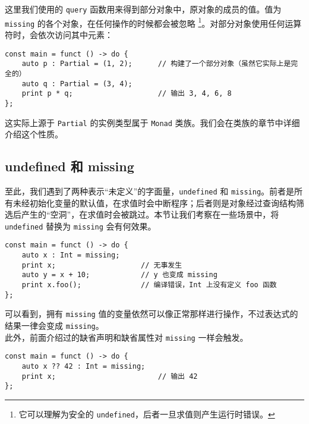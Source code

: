 这里我们使用的 \lstinline!query! 函数用来得到部分对象中，原对象的成员的值。值为 \lstinline!missing! 的各个对象，在任何操作的时候都会被忽略 \footnote{它可以理解为安全的 \lstinline!undefined!，后者一旦求值则产生运行时错误。}。对部分对象使用任何运算符时，会依次访问其中元素：

\begin{lstlisting}
const main = funct () -> do {
	auto p : Partial = (1, 2);		// 构建了一个部分对象（虽然它实际上是完全的）
	auto q : Partial = (3, 4);
	print p * q;					// 输出 3, 4, 6, 8
};
\end{lstlisting}

这实际上源于 \lstinline!Partial! 的实例类型属于 \lstinline!Monad! 类族。我们会在类族的章节中详细介绍这个性质。


\subsection{undefined 和 missing}

至此，我们遇到了两种表示“未定义”的字面量，\lstinline!undefined! 和 \lstinline!missing!。前者是所有未经初始化变量的默认值，在求值时会中断程序；后者则是对象经过查询结构筛选后产生的“空洞”，在求值时会被跳过。本节让我们考察在一些场景中，将 \lstinline!undefined! 替换为 \lstinline!missing! 会有何效果。

\begin{minipage}[c]{0.95\textwidth}
\vspace{1.0em}
\begin{lstlisting}
const main = funct () -> do {
    auto x : Int = missing;
    print x;					// 无事发生
    auto y = x + 10;			// y 也变成 missing
    print x.foo();				// 编译错误，Int 上没有定义 foo 函数
};
\end{lstlisting}
\end{minipage}

可以看到，拥有 \lstinline!missing! 值的变量依然可以像正常那样进行操作，不过表达式的结果一律会变成 \lstinline!missing!。 \\

此外，前面介绍过的缺省声明和缺省属性对 \lstinline!missing! 一样会触发。

\begin{minipage}[c]{0.95\textwidth}
\vspace{1.0em}
\begin{lstlisting}
const main = funct () -> do {
    auto x ?? 42 : Int = missing;
    print x;						// 输出 42
};
\end{lstlisting}
\end{minipage}
